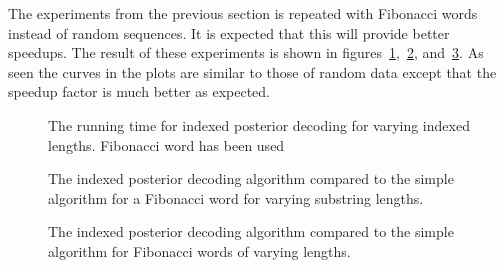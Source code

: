 The experiments from the previous section is repeated with Fibonacci words
instead of random sequences. It is expected that this will provide better
speedups. The result of these experiments is shown in
figures~\ref{fig:assymptotic_indexed_posterior_fib_subseq_length.tex},~\ref{fig:fib_indexed_posterior_speedup_vs_subseq},
and~\ref{fig:indexed_posterior_fib_speedup_vs_T}. As seen the curves in the
plots are similar to those of random data except that the speedup factor is
much better as expected.

\begin{figure}
  \centering
  
  \caption{The running time for indexed posterior decoding for
    varying indexed lengths. Fibonacci word has been used}
  \label{fig:assymptotic_indexed_posterior_fib_subseq_length.tex}
\end{figure}

\begin{figure}
  \centering
  
  \caption{The indexed posterior decoding algorithm compared to the simple
    algorithm for a Fibonacci word for varying substring lengths.}
  \label{fig:fib_indexed_posterior_speedup_vs_subseq}
\end{figure}

\begin{figure}
  \centering
  
  \caption{The indexed posterior decoding algorithm compared to the simple
    algorithm for Fibonacci words of varying lengths.}
  \label{fig:indexed_posterior_fib_speedup_vs_T}
\end{figure}

